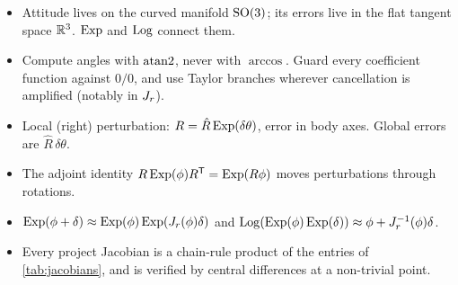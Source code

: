\begin{takeaways}
\begin{itemize}
  \item Attitude lives on the curved manifold $\mathrm{SO}(3)$; its errors live in the flat tangent space $\mathbb{R}^3$.
        $\operatorname{Exp}$ and $\operatorname{Log}$ connect them.
  \item Compute angles with $\operatorname{atan2}$, never with $\arccos$. Guard every coefficient function against
        $0/0$, and use Taylor branches wherever cancellation is amplified (notably in $J_r$).
  \item Local (right) perturbation: $R = \hat R\operatorname{Exp}(\delta\theta)$, error in body axes. Global errors are
        $\hat R\,\delta\theta$.
  \item The adjoint identity $R\operatorname{Exp}(\phi)R^{\mathsf{T}} = \operatorname{Exp}(R\phi)$ moves perturbations through rotations.
  \item $\operatorname{Exp}(\phi + \delta) \approx \operatorname{Exp}(\phi)\operatorname{Exp}(J_r(\phi)\delta)$ and
        $\operatorname{Log}(\operatorname{Exp}(\phi)\operatorname{Exp}(\delta)) \approx \phi + J_r^{-1}(\phi)\delta$.
  \item Every project Jacobian is a chain-rule product of the entries of \cref{tab:jacobians}, and is
        verified by central differences at a non-trivial point.
\end{itemize}
\end{takeaways}

